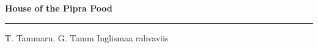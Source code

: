 \documentclass[10pt]{book}
\begin{document}
{
  \samepage
  \raggedbottom
  \raggedright
  \sloppy


  \vspace{0.2in}

  \noindent\begin{minipage}{.1\textwidth}
    \hfill\vspace{0.1in}
  \end{minipage}%
  \noindent\begin{minipage}{.8\textwidth}
    \centering
    \bfseries
    \large House of the Pipra Pood
  \end{minipage}%
  \noindent\begin{minipage}{.1\textwidth}
      \hfill\vspace{0.1in}
  \end{minipage}

  \nopagebreak[4]
  \vspace{0.1in}
  \nopagebreak[4]
  \hrule height 0.05ex
  \nopagebreak[4]
  \vspace{-0.05in}

  {\footnotesize T. Tammaru, G. Tamm \hfill Inglismaa rahvaviis }\\
  \vspace{0.01in}



}
\end{document}
